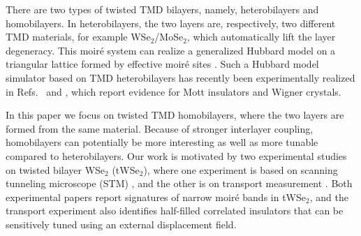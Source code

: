 \documentclass[aps,prx,floatfix,twocolumn]{revtex4-1}
\begin{document}
	There are two types of twisted TMD bilayers, namely, heterobilayers and homobilayers. In heterobilayers, the two layers are, respectively, two different TMD materials, for example WSe$_2$/MoSe$_2$, which automatically lift the layer degeneracy. This moir\'e system can realize a generalized Hubbard model on a triangular lattice formed by effective moir\'e sites \cite{wu2018hubbard}. Such a Hubbard model simulator based on TMD heterobilayers has recently been experimentally realized in Refs.~ and , which report evidence for Mott insulators and Wigner crystals.
	
	In this paper we focus on twisted TMD homobilayers, where the two layers are formed from the same material. Because of stronger interlayer coupling, homobilayers can potentially be more interesting as well as more tunable compared to heterobilayers.  Our work is motivated by two experimental studies on twisted bilayer WSe$_2$ (tWSe$_2$), where one experiment is based on  scanning tunneling microscope (STM) \cite{zhang2020flat}, and the other is on transport measurement \cite{wang2019magic}. Both experimental papers \cite{zhang2020flat,wang2019magic} report signatures of narrow moir\'e bands in tWSe$_2$, and the transport experiment \cite{wang2019magic} also identifies half-filled correlated insulators that can be sensitively tuned using an external displacement field. 
    
\end{document}
